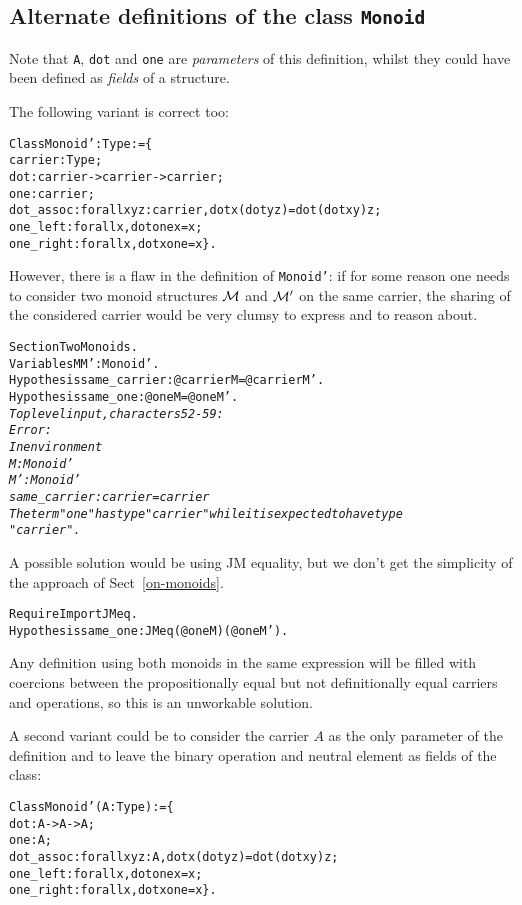 \documentclass[a4]{report}
\begin{document}
\subsection{Alternate definitions of the class \texttt{Monoid}}
\label{alternate}
Note that \texttt{A}, \texttt{dot} and \texttt{one} are \emph{parameters}
of this definition, whilst they could have been defined as \emph{fields}
of a structure.

The following variant is correct too:
\begin{alltt}
Class Monoid'  : Type := \{
  carrier: Type;
  dot : carrier -> carrier -> carrier; 
  one : carrier;
  dot_assoc : forall x y z:carrier, dot x (dot y z)= dot (dot x y) z;
  one_left : forall x, dot one x = x;
  one_right : forall x, dot x one = x\}.
\end{alltt}

However, there is a flaw in the definition of \texttt{Monoid'}: if for some
reason one needs to consider two monoid structures ${\cal M}$ and
${\cal M'}$ on the same carrier, the sharing of the considered carrier would
be very clumsy to express and to reason about.

\begin{alltt}
Section TwoMonoids.
 Variables M M' : Monoid'.
 Hypothesis same_carrier : @carrier M = @carrier M'.
 Hypothesis same_one : @one M = @one M'.\it\color{red}
Toplevel input, characters 52-59:
Error:
In environment
M : Monoid'
M' : Monoid'
same_carrier : carrier = carrier
The term "one" has type "carrier" while it is expected to have type
 "carrier".
\end{alltt}

A possible solution would be using JM equality, but we don't get the
simplicity of the approach of Sect~\ref{on-monoids}.
 \begin{alltt}
 Require Import JMeq.
 Hypothesis same_one : JMeq (@one M) (@one M').
\end{alltt}

Any definition using both monoids in the same expression will be filled
with coercions between the propositionally equal but not definitionally
equal carriers and operations, so this is an unworkable solution. 

A second variant could be to consider the carrier $A$ as the only parameter of
the definition and to leave the binary operation and neutral element as fields
of the class:
\begin{alltt}
Class Monoid' (A:Type) := \{
 dot : A ->  A -> A;
 one : A;
 dot_assoc : forall x y z:A, dot x (dot y z)= dot (dot x y) z;
 one_left : forall x, dot one x = x;
 one_right : forall x, dot x one = x\}.
\end{alltt}
\end{document}
